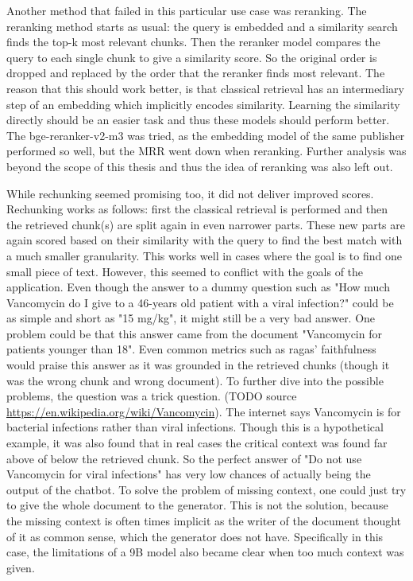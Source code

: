 Another method that failed in this particular use case was reranking. The reranking method starts as usual: the query is embedded and a similarity search finds the top-k most relevant chunks. Then the reranker model compares the query to each single chunk to give a similarity score. So the original order is dropped and replaced by the order that the reranker finds most relevant. The reason that this should work better, is that classical retrieval has an intermediary step of an embedding which implicitly encodes similarity. Learning the similarity directly should be an easier task and thus these models should perform better. The bge-reranker-v2-m3 was tried, as the embedding model of the same publisher performed so well, but the MRR went down when reranking. Further analysis was beyond the scope of this thesis and thus the idea of reranking was also left out.

While rechunking seemed promising too, it did not deliver improved scores. Rechunking works as follows: first the classical retrieval is performed and then the retrieved chunk(s) are split again in even narrower parts. These new parts are again scored based on their similarity with the query to find the best match with a much smaller granularity. This works well in cases where the goal is to find one small piece of text. However, this seemed to conflict with the goals of the application. Even though the answer to a dummy question such as "How much Vancomycin do I give to a 46-years old patient with a viral infection?" could be as simple and short as "15 mg/kg", it might still be a very bad answer. One problem could be that this answer came from the document "Vancomycin for patients younger than 18". Even common metrics such as ragas' faithfulness would praise this answer as it was grounded in the retrieved chunks (though it was the wrong chunk and wrong document). To further dive into the possible problems, the question was a trick question. (TODO source \url{https://en.wikipedia.org/wiki/Vancomycin}). The internet says Vancomycin is for bacterial infections rather than viral infections. Though this is a hypothetical example, it was also found that in real cases the critical context was found far above of below the retrieved chunk. So the perfect answer of "Do not use Vancomycin for viral infections" has very low chances of actually being the output of the chatbot. To solve the problem of missing context, one could just try to give the whole document to the generator. This is not the solution, because the missing context is often times implicit as the writer of the document thought of it as common sense, which the generator does not have. Specifically in this case, the limitations of a 9B model also became clear when too much context was given.

